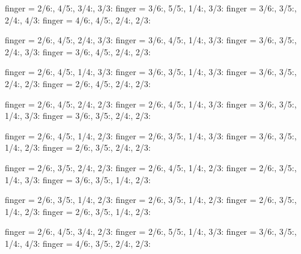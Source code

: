 \documentclass[../main.tex]{subfiles}
\begin{document}

  {finger = {2/6:\R, 4/5:, 3/4:, 3/3:}}
  {finger = {3/6:, 5/5:, 1/4:\R, 3/3:}}
  {finger = {3/6:, 3/5:\R, 2/4:, 4/3:}}
  {finger = {4/6:, 4/5:, 2/4:, 2/3:\R}}

  {finger = {2/6:\R, 4/5:, 2/4:, 3/3:}}
  {finger = {3/6:, 4/5:, 1/4:\R, 3/3:}}
  {finger = {3/6:, 3/5:\R, 2/4:, 3/3:}}
  {finger = {3/6:, 4/5:, 2/4:, 2/3:\R}}

  {finger = {2/6:\R, 4/5:, 1/4:, 3/3:}}
  {finger = {3/6:, 3/5:, 1/4:\R, 3/3:}}
  {finger = {3/6:, 3/5:\R, 2/4:, 2/3:}}
  {finger = {2/6:, 4/5:, 2/4:, 2/3:\R}}

  {finger = {2/6:\R, 4/5:, 2/4:, 2/3:}}
  {finger = {2/6:, 4/5:, 1/4:\R, 3/3:}}
  {finger = {3/6:, 3/5:\R, 1/4:, 3/3:}}
  {finger = {3/6:, 3/5:, 2/4:, 2/3:\R}}


  {finger = {2/6:\R, 4/5:, 1/4:, 2/3:}}
  {finger = {2/6:, 3/5:, 1/4:\R, 3/3:}}
  {finger = {3/6:, 3/5:\R, 1/4:, 2/3:}}
  {finger = {2/6:, 3/5:, 2/4:, 2/3:\R}}

  {finger = {2/6:\R, 3/5:, 2/4:, 2/3:}}
  {finger = {2/6:, 4/5:, 1/4:\R, 2/3:}}
  {finger = {2/6:, 3/5:\R, 1/4:, 3/3:}}
  {finger = {3/6:, 3/5:, 1/4:, 2/3:\R}}


  {finger = {2/6:\R, 3/5:, 1/4:, 2/3:}}
  {finger = {2/6:, 3/5:, 1/4:\R, 2/3:}}
  {finger = {2/6:, 3/5:\R, 1/4:, 2/3:}}
  {finger = {2/6:, 3/5:, 1/4:, 2/3:\R}}

  {finger = {2/6:\R, 4/5:, 3/4:, 2/3:}}
  {finger = {2/6:, 5/5:, 1/4:\R, 3/3:}}
  {finger = {3/6:, 3/5:\R, 1/4:, 4/3:}}
  {finger = {4/6:, 3/5:, 2/4:, 2/3:\R}}
\end{document}

